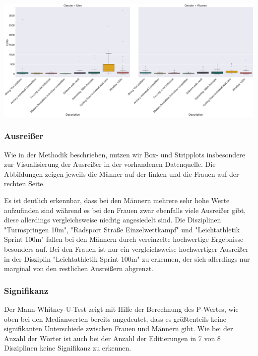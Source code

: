 \documentclass[11pt]{article}
\begin{document}
\includegraphics[width=1\textwidth]{figures/editcount_boxplot.png}

\subsubsection{Ausreißer}
Wie in der Methodik beschrieben, nutzen wir Box- und Stripplots insbesondere zur Visualisierung der Ausreißer in der vorhandenen Datenquelle. Die Abbildungen zeigen jeweils die Männer auf der linken und die Frauen auf der rechten Seite. 

Es ist deutlich erkennbar, dass bei den Männern mehrere sehr hohe Werte aufzufinden sind während es bei den Frauen zwar ebenfalls viele Ausreißer gibt, diese allerdings vergleichsweise niedrig angesiedelt sind. Die Disziplinen "Turmspringen 10m", "Radsport Straße Einzelwettkampf" und  "Leichtathletik Sprint 100m" fallen bei den Männern durch vereinzelte hochwertige Ergebnisse besonders auf. Bei den Frauen ist nur ein vergleichsweise hochwertiger Ausreißer in der Disziplin "Leichtathletik Sprint 100m" zu erkennen, der sich allerdings nur marginal von den restlichen Ausreißern abgrenzt. 

\subsubsection{Signifikanz}

Der Mann-Whitney-U-Test zeigt mit Hilfe der Berechnung des P-Wertes, wie oben bei den Medianwerten bereits angedeutet, dass es größtenteils keine signifikanten Unterschiede zwischen Frauen und Männern gibt. Wie bei der Anzahl der Wörter ist auch bei der Anzahl der Editierungen in 7 von 8 Disziplinen keine Signifikanz zu erkennen.
\end{document}
